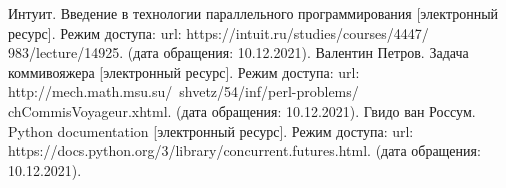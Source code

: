 \documentclass[12pt]{report}
\begin{document}
\begin{thebibliography}{2}
	 Интуит. Введение в технологии параллельного программирования [электронный ресурс]. Режим доступа: url: https://intuit.ru/studies/courses/4447/ 983/lecture/14925. (дата обращения: 10.12.2021).
	 Валентин Петров. Задача коммивояжера [электронный ресурс]. Режим доступа: url: http://mech.math.msu.su/~shvetz/54/inf/perl-problems/ chCommisVoyageur.xhtml. (дата обращения: 10.12.2021).
	 Гвидо ван Россум. Python documentation [электронный ресурс]. Режим доступа: url: https://docs.python.org/3/library/concurrent.futures.html. (дата обращения: 10.12.2021).
	
\end{thebibliography}
\end{document}
